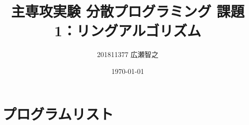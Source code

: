\documentclass[a4paper,titlepage]{jlreq}
\title{主専攻実験 分散プログラミング 課題1：リングアルゴリズム}
\author{201811377 広瀬智之}
\date{\today}
\begin{document}
\maketitle


\section{プログラムリスト}



\end{document}
